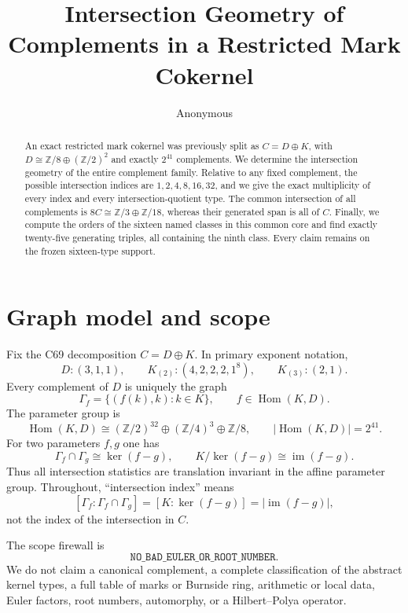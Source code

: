 \documentclass[10pt]{article}
\title{Intersection Geometry of Complements in a Restricted Mark Cokernel}
\author{Anonymous}
\date{}
\newcommand{\Z}{\mathbb Z}
\newcommand{\Hom}{\operatorname{Hom}}
\newcommand{\im}{\operatorname{im}}
\begin{document}
\maketitle

\begin{abstract}
An exact restricted mark cokernel was previously split as $C=D\oplus K$, with
$D\cong\mathbb Z/8\oplus(\mathbb Z/2)^2$ and exactly $2^{41}$ complements.
We determine the intersection geometry of the entire complement family.
Relative to any fixed complement, the possible intersection indices are
$1,2,4,8,16,32$, and we give the exact multiplicity of every index and every
intersection-quotient type.  The common intersection of all complements is
$8C\cong\mathbb Z/3\oplus\mathbb Z/18$, whereas their generated span is all
of $C$.  Finally, we compute the orders of the sixteen named classes in this
common core and find exactly twenty-five generating triples, all containing
the ninth class.  Every claim remains on the frozen sixteen-type support.
\end{abstract}

\section{Graph model and scope}
Fix the C69 decomposition $C=D\oplus K$.  In primary exponent notation,
\[
 D:(3,1,1),\qquad K_{(2)}:(4,2,2,2,1^8),\qquad K_{(3)}:(2,1).
\]
Every complement of $D$ is uniquely the graph
\[
 \Gamma_f=\{(f(k),k):k\in K\},\qquad f\in\Hom(K,D).
\]
The parameter group is
\[
 \Hom(K,D)\cong(\Z/2)^{32}\oplus(\Z/4)^3\oplus\Z/8,
 \qquad |\Hom(K,D)|=2^{41}.
\]
For two parameters $f,g$ one has
\begin{equation}\label{eq:graph}
 \Gamma_f\cap\Gamma_g\cong\ker(f-g),\qquad
 K/\ker(f-g)\cong\im(f-g).
\end{equation}
Thus all intersection statistics are translation invariant in the affine
parameter group.  Throughout, ``intersection index'' means
\[
 [\Gamma_f:\Gamma_f\cap\Gamma_g]=[K:\ker(f-g)]=|\im(f-g)|,
\]
not the index of the intersection in $C$.

The scope firewall is
\[
\texttt{NO\_BAD\_EULER\_OR\_ROOT\_NUMBER}.
\]
We do not claim a canonical complement, a complete classification of the
abstract kernel types, a full table of marks or Burnside ring, arithmetic or
local data, Euler factors, root numbers, automorphy, or a Hilbert--Polya
operator.
\end{document}
